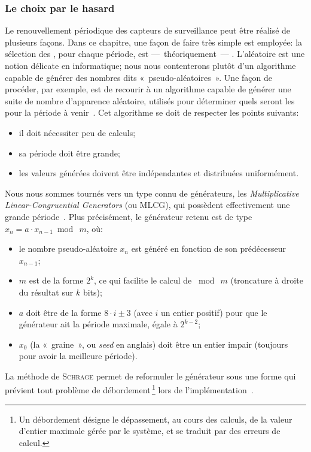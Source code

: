         \subsubsection{Le choix par le hasard}
Le renouvellement périodique des capteurs de surveillance peut être réalisé de plusieurs façons.
Dans ce chapitre, une façon de faire très simple est employée: la sélection des \cns, pour chaque période, est ---~théoriquement~--- .
L'aléatoire est une notion délicate en informatique; nous nous contenterons plutôt d'un algorithme capable de générer des nombres dits «~pseudo-aléatoires~».
Une façon de procéder, par exemple, est de recourir à un algorithme capable de générer une suite de nombre d'apparence aléatoire, utilisés pour déterminer quels seront les \cns pour la période à venir~\cite{GMT12}.
Cet algorithme se doit de respecter les points suivants:
\begin{itemize}
    \item il doit nécessiter peu de calculs;
    \item sa période doit être grande;
    \item les valeurs générées doivent être indépendantes et distribuées uniformément.
\end{itemize}
Nous nous sommes tournés vers un type connu de générateurs, les \textit{Multiplicative Linear-Congruential Generators} (ou MLCG), qui possèdent effectivement une grande période~\cite{RJ91}.
Plus précisément, le générateur retenu est de type $x_n = a\cdot x_{n-1}\bmod\ m$, où:
\begin{itemize}
    \item le nombre pseudo-aléatoire $x_n$ est généré en fonction de son prédécesseur $x_{n-1}$;
    \item $m$ est de la forme $2^k$, ce qui facilite le calcul de $\bmod\ m$ (troncature à droite du résultat sur $k$ bits);
    \item $a$ doit être de la forme $8\cdot i\pm3$ (avec $i$ un entier positif) pour que le générateur ait la période maximale, égale à $2^{k-2}$;
    \item $x_0$ (la «~graine~», ou \textit{seed} en anglais) doit être un entier impair (toujours pour avoir la meilleure période).
\end{itemize}
La méthode de \textsc{Schrage} permet de reformuler le générateur sous une forme qui prévient tout problème de débordement\,\footnote{Un débordement désigne le dépassement, au cours des calculs, de la valeur d'entier maximale gérée par le système, et se traduit par des erreurs de calcul.} lors de l'implémentation~\cite{RJ91}.
